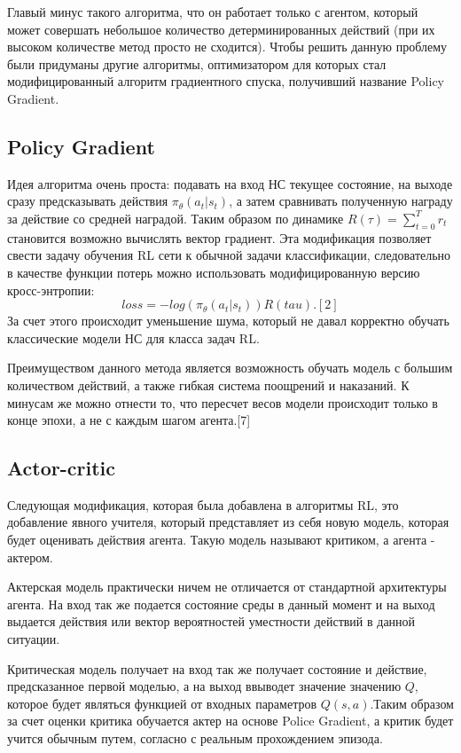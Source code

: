 \documentclass[bachelor, och, referat]{shiza}
\begin{document}
Главый минус такого алгоритма, что он работает только с агентом, который может совершать небольшое количество детерминированных действий (при их высоком количестве метод просто не сходится).
Чтобы решить данную проблему были придуманы другие алгоритмы, оптимизатором для которых стал модифицированный алгоритм градиентного спуска, получивший название Policy Gradient.

\subsection{Policy Gradient}
Идея алгоритма очень проста: подавать на вход НС текущее состояние, на выходе сразу предсказывать действия $\pi_\theta(a_t|s_t)$, а затем сравнивать полученную награду за действие
со средней наградой. Таким образом по динамике $R(\tau) = \sum_{t=0}^T r_t$ становится возможно вычислять вектор градиент. Эта модификация позволяет свести задачу обучения RL сети к
обычной задачи классификации, следовательно в качестве функции потерь можно использовать модифицированную версию кросс-энтропии:
\begin{equation}
    loss = -log(\pi_\theta(a_t|s_t))R(tau). [2]
\end{equation}
За счет этого происходит уменьшение шума, который не давал корректно обучать классические модели НС для класса задач RL.

Преимуществом данного метода является возможность обучать модель с большим количеством действий, а также гибкая система поощрений и наказаний. К минусам же можно отнести
то, что пересчет весов модели происходит только в конце эпохи, а не с каждым шагом агента.[7]
\subsection{Actor-critic}
Следующая модификация, которая была добавлена в алгоритмы RL, это добавление явного учителя, который представляет из себя новую модель, которая будет оценивать действия
агента. Такую модель называют критиком, а агента - актером.

Актерская модель практически ничем не отличается от стандартной архитектуры агента. На вход так же подается состояние среды в данный момент и на выход выдается действия
или вектор вероятностей уместности действий в данной ситуации.

Критическая модель получает на вход так же получает состояние и действие, предсказанное первой моделью, а на выход ввыводет значение значению $Q$, которое будет
являться функцией от входных параметров $Q(s, a)$.Таким образом за счет оценки критика обучается актер на основе Police Gradient, а критик будет учится обычным
путем, согласно с реальным прохождением эпизода.
\end{document}
